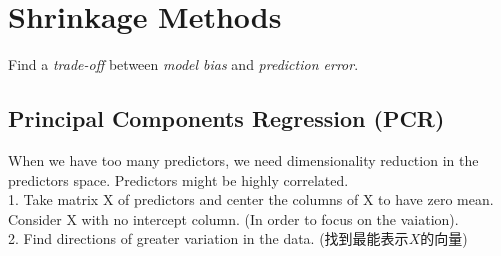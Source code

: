 \documentclass[11pt,a4paper]{article}
\begin{document}
\section{Shrinkage Methods}
Find a \textit{trade-off} between \textit{model bias} and \textit{prediction error}.
\subsection{ Principal Components Regression (PCR)}
When we have too many predictors, we need dimensionality reduction in the predictors space. Predictors might be highly correlated.\\
1. Take matrix X of predictors and center the columns of X to have zero mean. Consider X with no intercept column. (In order to focus on the vaiation).\\
2. Find directions of greater variation in the data. (找到最能表示$X$的向量)
\end{document}
